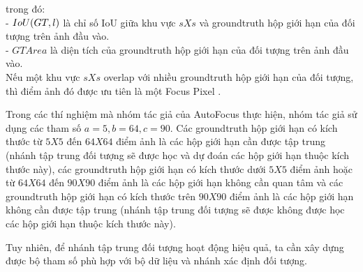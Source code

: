 {    \noindent
    trong đó: \\
    - $IoU\index{IoU}(GT, l)$ là chỉ số IoU giữa khu vực $s X s$ và groundtruth hộp giới hạn của đối tượng trên ảnh đầu vào. \\
    - $GTArea$ là diện tích của groundtruth hộp giới hạn của đối tượng trên ảnh đầu vào. \\
    Nếu một khu vực $s X s$ overlap với nhiều groundtruth hộp giới hạn của đối tượng, thì điểm ảnh đó được ưu tiên là một Focus Pixel .

    \noindent
    Trong các thí nghiệm mà nhóm tác giả của AutoFocus \cite{najibi2019autofocus} thực hiện, nhóm tác giả sử dụng các tham số $a = 5, b = 64, c = 90$.
    Các groundtruth hộp giới hạn có kích thước từ $5 X 5$ đến $64 X 64$ điểm ảnh là các hộp giới hạn cần được tập trung (nhánh tập trung đối tượng sẽ được học và dự đoán các hộp giới hạn thuộc kích thước này), các groundtruth hộp giới hạn có kích thước dưới $5 X 5$ điểm ảnh hoặc từ $64 X 64$ đến $90 X 90$ điểm ảnh là các hộp giới hạn không cần quan tâm và các groundtruth hộp giới hạn có kích thước trên $90 X 90$ điểm ảnh là các hộp giới hạn không cần được tập trung (nhánh tập trung đối tượng sẽ được không được học các hộp giới hạn thuộc kích thước này).
    
    \noindent
    Tuy nhiên, để nhánh tập trung đối tượng hoạt động hiệu quả, ta cần xây dựng được bộ tham số phù hợp với bộ dữ liệu và nhánh xác định đối tượng.

}

